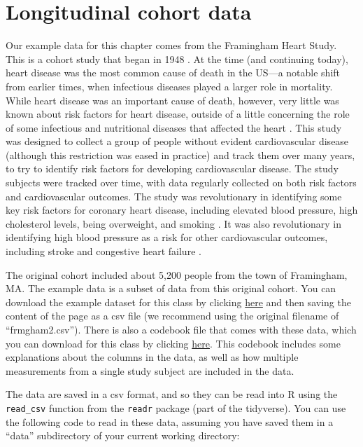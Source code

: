 \documentclass[
]{book}
\begin{document}
\hypertarget{longitudinal-cohort-data}{%
\section{Longitudinal cohort data}\label{longitudinal-cohort-data}}

Our example data for this chapter comes from the Framingham Heart Study. This is a cohort study that began in 1948 \citep{andersson201970}. At the time (and continuing today), heart disease was the most common cause of death in the US---a notable shift from earlier times, when infectious diseases played a larger role in mortality. While heart disease was an important cause of death, however, very little was known about risk factors for heart disease, outside of a little concerning the role of some infectious and nutritional diseases that affected the heart \citep{dawber1951epidemiological, andersson201970}. This study was designed to collect a group of people without evident cardiovascular disease (although this restriction was eased in practice) and track them over many years, to try to identify risk factors for developing cardiovascular disease. The study subjects were tracked over time, with data regularly collected on both risk factors and cardiovascular outcomes. The study was revolutionary in identifying some key risk factors for coronary heart disease, including elevated blood pressure, high cholesterol levels, being overweight, and smoking \citep{andersson201970}. It was also revolutionary in identifying high blood pressure as a risk for other cardiovascular outcomes, including stroke and congestive heart failure \citep{andersson201970}.

The original cohort included about 5,200 people from the town of Framingham, MA. The
example data is a subset of data from this original cohort. You can download the example dataset for this class by clicking \href{https://github.com/geanders/adv_epi_analysis/raw/master/data/frmgham2.csv}{here} and then saving the content of the page as a csv file (we recommend using the original filename of ``frmgham2.csv''). There is also a codebook file that comes with these data, which you can download for this class by clicking \href{https://github.com/geanders/adv_epi_analysis/raw/master/data/Framingham\%20Longitudinal\%20Data\%20Documentation.pdf}{here}. This codebook includes some explanations about the columns in the data, as well as how multiple measurements from a single study subject are included in the data.

The data are saved in a csv format, and so they can be read into R using the
\texttt{read\_csv} function from the \texttt{readr} package (part of the tidyverse). You can use the following code to read in these data, assuming you have saved them in a ``data'' subdirectory of your current
working directory:
\end{document}
